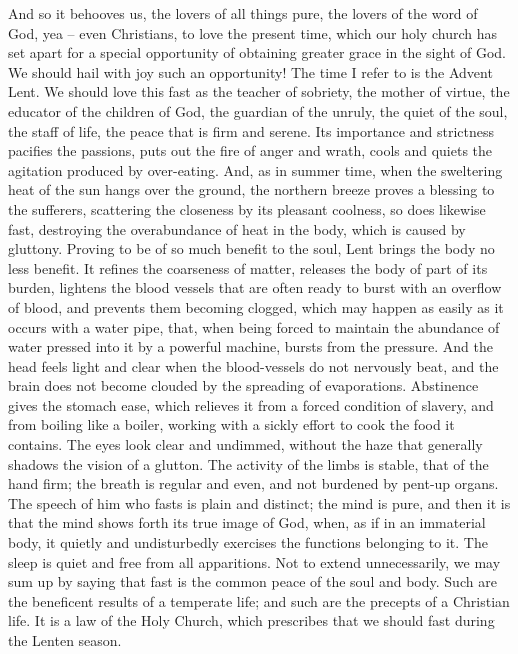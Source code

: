 And so it behooves us, the lovers of all things 
pure, the lovers of the word of God, yea -- even 
Christians, to love the present time, which our 
holy church has set apart for a special opportunity
of obtaining greater grace in the sight 
of God. We should hail with joy such an opportunity!
The time I refer to is the Advent 
Lent. We should love this fast as the teacher 
of sobriety, the mother of virtue, the educator 
of the children of God, the guardian of the 
unruly, the quiet of the soul, the staff of life, the 
peace that is firm and serene. Its importance 
and strictness pacifies the passions, puts out 
the fire of anger and wrath, cools and quiets the 
agitation produced by over-eating. And, as in 
summer time, when the sweltering heat of the
sun hangs over the ground, the northern breeze 
proves a blessing to the sufferers, scattering the 
closeness by its pleasant coolness, so does likewise
fast, destroying the overabundance of heat 
in the body, which is caused by gluttony. Proving
to be of so much benefit to the soul, Lent 
brings the body no less benefit. It refines the 
coarseness of matter, releases the body of part 
of its burden, lightens the blood vessels that 
are often ready to burst with an overflow of 
blood, and prevents them becoming clogged, 
which may happen as easily as it occurs with a 
water pipe, that, when being forced to maintain 
the abundance of water pressed into it by a 
powerful machine, bursts from the pressure. 
And the head feels light and clear when the 
blood-vessels do not nervously beat, and the 
brain does not become clouded by the spreading 
of evaporations. Abstinence gives the stomach 
ease, which relieves it from a forced condition
of slavery, and from boiling like a boiler, 
working with a sickly effort to cook the food it 
contains. The eyes look clear and undimmed, 
without the haze that generally shadows the 
vision of a glutton. The activity of the limbs 
is stable, that of the hand firm; the breath is 
regular and even, and not burdened by pent-up 
organs. The speech of him who fasts is plain 
and distinct; the mind is pure, and then it is 
that the mind shows forth its true image of 
God, when, as if in an immaterial body, it 
quietly and undisturbedly exercises the functions
belonging to it. The sleep is quiet and 
free from all apparitions. Not to extend 
unnecessarily, we may sum up by saying that 
fast is the common peace of the soul and body. 
Such are the beneficent results of a temperate 
life; and such are the precepts of a Christian 
life. It is a law of the Holy Church, which 
prescribes that we should fast during the Lenten 
season. 

